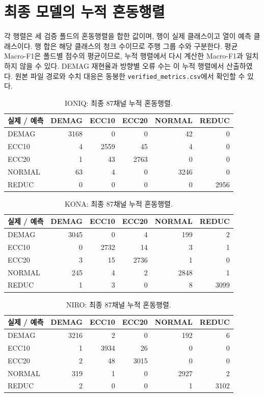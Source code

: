 \documentclass[11pt,a4paper]{article}
\begin{document}
\clearpage
\appendix
\section{최종 모델의 누적 혼동행렬}\label{app:cm}
각 행렬은 세 검증 폴드의 혼동행렬을 합한 값이며, 행이 실제 클래스이고 열이 예측 클래스이다.
행 합은 해당 클래스의 청크 수이므로 주행 그룹 수와 구분한다.
평균 Macro-F1은 폴드별 점수의 평균이므로, 누적 행렬에서 다시 계산한 Macro-F1과 일치하지 않을 수 있다.
DEMAG 재현율과 방향별 오류 수는 이 누적 행렬에서 산출하였다.
원본 파일 경로와 수치 대응은 동봉한 \texttt{verified\_metrics.csv}에서 확인할 수 있다.

\begin{table}[htbp]\centering\caption{IONIQ: 최종 87채널 누적 혼동행렬.}\begingroup\small\setlength{\tabcolsep}{5pt}
\begin{tabular}{lrrrrr}
\toprule
실제 / 예측 & DEMAG & ECC10 & ECC20 & NORMAL & REDUC \\
\midrule
DEMAG & 3168 & 0 & 0 & 42 & 0 \\
ECC10 & 4 & 2559 & 45 & 4 & 0 \\
ECC20 & 1 & 43 & 2763 & 0 & 0 \\
NORMAL & 63 & 4 & 0 & 3246 & 0 \\
REDUC & 0 & 0 & 0 & 0 & 2956 \\
\bottomrule
\end{tabular}
\endgroup\end{table}
\begin{table}[htbp]\centering\caption{KONA: 최종 87채널 누적 혼동행렬.}\begingroup\small\setlength{\tabcolsep}{5pt}
\begin{tabular}{lrrrrr}
\toprule
실제 / 예측 & DEMAG & ECC10 & ECC20 & NORMAL & REDUC \\
\midrule
DEMAG & 3045 & 0 & 4 & 199 & 2 \\
ECC10 & 0 & 2732 & 14 & 3 & 1 \\
ECC20 & 3 & 15 & 2736 & 1 & 0 \\
NORMAL & 245 & 4 & 2 & 2848 & 1 \\
REDUC & 1 & 3 & 0 & 8 & 3099 \\
\bottomrule
\end{tabular}
\endgroup\end{table}
\begin{table}[htbp]\centering\caption{NIRO: 최종 87채널 누적 혼동행렬.}\begingroup\small\setlength{\tabcolsep}{5pt}
\begin{tabular}{lrrrrr}
\toprule
실제 / 예측 & DEMAG & ECC10 & ECC20 & NORMAL & REDUC \\
\midrule
DEMAG & 3216 & 2 & 0 & 192 & 6 \\
ECC10 & 1 & 3934 & 26 & 0 & 0 \\
ECC20 & 2 & 48 & 3015 & 0 & 0 \\
NORMAL & 319 & 1 & 0 & 2927 & 2 \\
REDUC & 2 & 0 & 0 & 1 & 3102 \\
\bottomrule
\end{tabular}
\endgroup\end{table}
\end{document}
